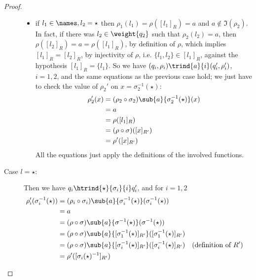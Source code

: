 \begin{proof}
\begin{description}
\begin{itemize}
	\item if $l_1 \in \names,l_2 = \star$ then $\rho_1(l_1) = \rho([l_1]_R) = a$ and $a \notin \Im(\rho_2)$. In fact, %
	if there was $l_2 \in \weight{q_2}$ such that $\rho_2(l_2) = a$, then $\rho([l_2]_R) = a = \rho([l_1]_R)$, by definition of $\rho$, which implies $[l_1]_R = [l_2]_R$, by injectivity of $\rho$, i.e. $\{l_1,l_2\} \in [l_1]_R$, against the hypothesis $[l_1]_R = \{l_1\}$. So we have $(q_i,\rho_i) \trind{a}{i} (q_i',\rho_i')$, $i=1,2$, and the same equations as the previous case hold; we just have to check the value of $\rho_2'$ on $x = \sigma_2^{-1}(\star)$:
	\begin{align*}
		\rho'_2(x) &= (\rho_2 \circ \sigma_2)\sub{a}{\sigma_2^{-1}(\star)}(x) \\
		&= a \\
		&= \rho([l_1]_R) \\
		&= (\rho \circ \sigma)([x]_{R'}) \\
		& = \rho'([x]_{R'})
	\end{align*}	
	All the equations just apply the definitions of the involved functions.
	\end{itemize}

	\item[Case $l = \star$:] 
	Then we have $q_i \htrind{\star}{\sigma_i}{i} q_i'$, and for $i=1,2$%
	\begin{align*}
		\rho'_i(\sigma_i^{-1}(\star)) &= (\rho_i \circ \sigma_i)\sub{a}{\sigma_i^{-1}(\star)}(\sigma_i^{-1}(\star)) \\
		&= a \\
		&= (\rho \circ \sigma) \sub{a}{\sigma^{-1}(\star)}(\sigma^{-1}(\star)) \\
		&= (\rho \circ \sigma) \sub{a}{[\sigma_1^{-1}(\star)]_{R'}}([\sigma_1^{-1}(\star)]_{R'}) \\
		& = (\rho \circ \sigma) \sub{a}{[\sigma_i^{-1}(\star)]_{R'}}([\sigma_i^{-1}(\star)]_{R'}) && \text{(definition of $R'$)} \\
		&= \rho'([\sigma_i(\star)^{-1}]_{R'})
	\end{align*}
	
\end{description} 
\end{proof}

